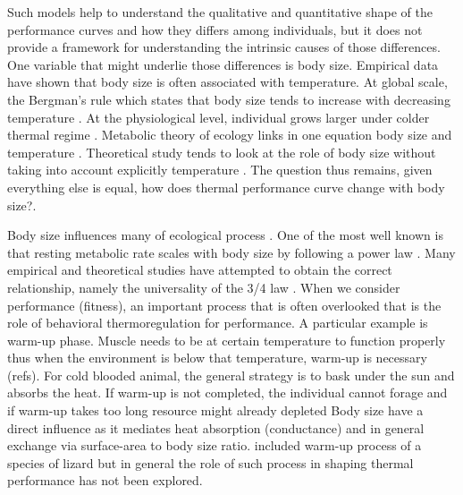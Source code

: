 Such models help to understand the qualitative and quantitative shape of the performance curves and how they differs  among individuals, but it does not provide a framework for understanding the intrinsic causes of those differences. %
One variable that might underlie those differences is body size.
Empirical data have shown that body size is often associated with temperature.  
At global scale, the Bergman's rule which states that body size tends to increase with decreasing temperature \citep{Bergman1847}.
At the physiological level, individual grows larger under colder thermal regime \citep{Van1996}.
Metabolic theory of ecology links in one equation body size and temperature \citep{Brown2004}.
Theoretical study tends to look at the role of body size without taking into account explicitly temperature \citep[e.g.,]{Yodzis1992, Brown1993}.
The question thus remains, given everything else is equal, how does thermal performance curve change with body size?.

Body size influences many of ecological process \citep{Peters1986}.
One of the most well known is that resting metabolic rate scales with body size by following a power law \citep{Kleiber1947, Peters1986, Brown2004}.
Many empirical and theoretical studies have attempted to obtain the correct relationship, namely the universality of the 3/4 law \citep{West1997, Kozlowski1997, Isaac2010}.
When we consider performance (fitness), an important process that is often overlooked that is the role of behavioral thermoregulation for performance. 
A particular example is warm-up phase. 
Muscle needs to be at certain temperature to function properly thus when the environment is below that temperature, warm-up is necessary (refs). 
For cold blooded animal, the general strategy is to bask under the sun and absorbs the heat.
If warm-up is not completed, the individual cannot forage and if warm-up takes too long resource might already depleted
Body size have a direct influence as it mediates heat absorption (conductance) and in general exchange via surface-area to body size ratio.
\citet{Buckley2008} included warm-up process of a species of lizard but in general the role of such process in shaping thermal performance has not been explored.
 
